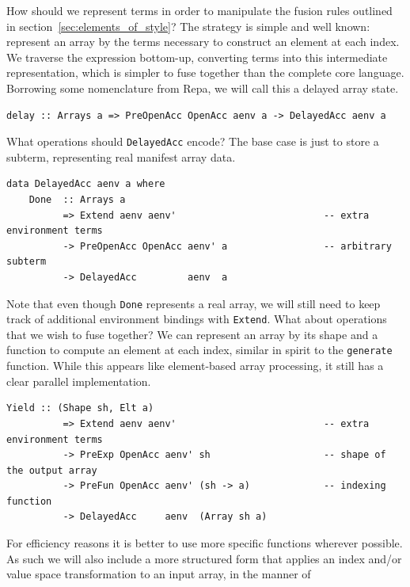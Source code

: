 How should we represent terms in order to manipulate the fusion rules outlined
in section~\ref{sec:elements_of_style}? The strategy is simple and well known:
represent an array by the terms necessary to construct an element at each index.
We traverse the expression bottom-up, converting terms into this intermediate
representation, which is simpler to fuse together than the complete core
language. Borrowing some nomenclature from Repa, we will call this a delayed
array state.
%
%
\begin{lstlisting}[style=haskell,numbers=none]
delay :: Arrays a => PreOpenAcc OpenAcc aenv a -> DelayedAcc aenv a
\end{lstlisting}
%
What operations should \texttt{DelayedAcc} encode? The base case is just to
store a subterm, representing real manifest array data.
%
\begin{lstlisting}[style=haskell]
data DelayedAcc aenv a where
    Done  :: Arrays a
          => Extend aenv aenv'                          -- extra environment terms
          -> PreOpenAcc OpenAcc aenv' a                 -- arbitrary subterm
          -> DelayedAcc         aenv  a
\end{lstlisting}
%
Note that even though \texttt{Done} represents a real array, we will still need
to keep track of additional environment bindings with \texttt{Extend}.
What about operations that we wish to fuse together? We can represent an array
by its shape and a function to compute an element at each index, similar in
spirit to the \texttt{generate} function. While this appears like element-based
array processing, it still has a clear parallel implementation.
%
\begin{lstlisting}[style=haskell,firstnumber=last]
    Yield :: (Shape sh, Elt a)
          => Extend aenv aenv'                          -- extra environment terms
          -> PreExp OpenAcc aenv' sh                    -- shape of the output array
          -> PreFun OpenAcc aenv' (sh -> a)             -- indexing function
          -> DelayedAcc     aenv  (Array sh a)
\end{lstlisting}
%
For efficiency reasons it is better to use more specific functions wherever
possible. As such we will also include a more structured form that applies an
index and/or value space transformation to an input array, in the manner of
